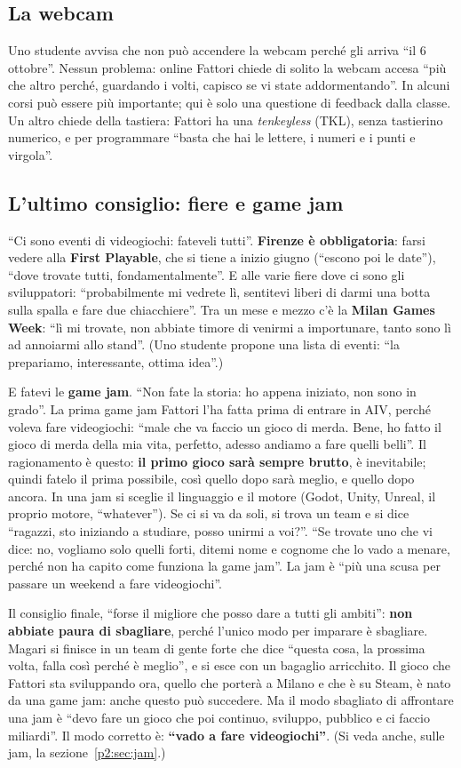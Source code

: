 \subsection{La webcam}

Uno studente avvisa che non può accendere la webcam perché gli arriva ``il 6
ottobre''. Nessun problema: online Fattori chiede di solito la webcam accesa
``più che altro perché, guardando i volti, capisco se vi state addormentando''.
In alcuni corsi può essere più importante; qui è solo una questione di
feedback dalla classe. Un altro chiede della tastiera: Fattori ha una
\emph{tenkeyless} (TKL), senza tastierino numerico, e per programmare ``basta
che hai le lettere, i numeri e i punti e virgola''.

\subsection{L'ultimo consiglio: fiere e game jam}

``Ci sono eventi di videogiochi: fateveli tutti''. \textbf{Firenze è
obbligatoria}: farsi vedere alla \textbf{First Playable}, che si tiene a
inizio giugno (``escono poi le date''), ``dove trovate tutti, fondamentalmente''.
E alle varie fiere dove ci sono gli sviluppatori: ``probabilmente mi vedrete
lì, sentitevi liberi di darmi una botta sulla spalla e fare due chiacchiere''.
Tra un mese e mezzo c'è la \textbf{Milan Games Week}: ``lì mi trovate, non
abbiate timore di venirmi a importunare, tanto sono lì ad annoiarmi allo
stand''. (Uno studente propone una lista di eventi: ``la prepariamo,
interessante, ottima idea''.)

E fatevi le \textbf{game jam}. ``Non fate la storia: ho appena iniziato, non
sono in grado''. La prima game jam Fattori l'ha fatta prima di entrare in AIV,
perché voleva fare videogiochi: ``male che va faccio un gioco di merda. Bene, ho
fatto il gioco di merda della mia vita, perfetto, adesso andiamo a fare quelli
belli''. Il ragionamento è questo: \textbf{il primo gioco sarà sempre brutto},
è inevitabile; quindi fatelo il prima possibile, così quello dopo sarà meglio,
e quello dopo ancora. In una jam si sceglie il linguaggio e il motore (Godot,
Unity, Unreal, il proprio motore, ``whatever''). Se ci si va da soli, si trova
un team e si dice ``ragazzi, sto iniziando a studiare, posso unirmi a voi?''.
``Se trovate uno che vi dice: no, vogliamo solo quelli forti, ditemi nome e
cognome che lo vado a menare, perché non ha capito come funziona la game
jam''. La jam è ``più una scusa per passare un weekend a fare videogiochi''.

Il consiglio finale, ``forse il migliore che posso dare a tutti gli ambiti'':
\textbf{non abbiate paura di sbagliare}, perché l'unico modo per imparare è
sbagliare. Magari si finisce in un team di gente forte che dice ``questa cosa,
la prossima volta, falla così perché è meglio'', e si esce con un bagaglio
arricchito. Il gioco che Fattori sta sviluppando ora, quello che porterà a
Milano e che è su Steam, è nato da una game jam: anche questo può succedere.
Ma il modo sbagliato di affrontare una jam è ``devo fare un gioco che poi
continuo, sviluppo, pubblico e ci faccio miliardi''. Il modo corretto è:
\textbf{``vado a fare videogiochi''}. (Si veda anche, sulle jam, la
sezione~\ref{p2:sec:jam}.)
